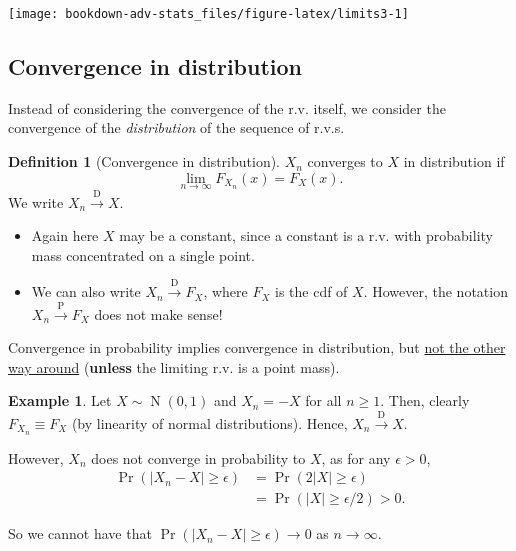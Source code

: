 \documentclass[
]{book}
\providecommand{\tightlist}{%
  \setlength{\itemsep}{0pt}\setlength{\parskip}{0pt}}
\DeclareMathOperator{\N}{N}
\theoremstyle{definition}
\newtheorem{definition}{Definition}[chapter]
\theoremstyle{definition}
\newtheorem{example}{Example}[chapter]
\theoremstyle{definition}
\theoremstyle{definition}
\theoremstyle{remark}
\begin{document}
\begin{center}\texttt{[image: bookdown-adv-stats\_files/figure-latex/limits3-1]} \end{center}

\hypertarget{convergence-in-distribution}{%
\subsection{Convergence in distribution}\label{convergence-in-distribution}}

Instead of considering the convergence of the r.v. itself, we consider the convergence of the \emph{distribution} of the sequence of r.v.s.

\begin{definition}[Convergence in distribution]
\(X_n\) converges to \(X\) in distribution if
\[\lim_{n\to\infty}F_{X_n}(x) = F_X(x).\]
We write
\(X_n\xrightarrow{\text{D}}X\).
\end{definition}

\begin{itemize}
\tightlist
\item
  Again here \(X\) may be a constant, since a constant is a r.v. with probability mass concentrated on a single point.
\item
  We can also write \(X_n{\xrightarrow{\text{D}}} F_X\), where \(F_X\) is the cdf of \(X\). However, the notation \(X_n{\xrightarrow{\text{P}}} F_X\) does not make sense!
\end{itemize}

Convergence in probability implies convergence in distribution, but \uline{not the other way around} (\textbf{unless} the limiting r.v. is a point mass).

\begin{example}
Let \(X\sim\N(0,1)\) and \(X_n=-X\) for all \(n \geq 1\). Then, clearly
\(F_{X_n} \equiv F_{X}\) (by linearity of normal distributions). Hence,
\(X_n\xrightarrow{\text{D}}X\).

However, \(X_n\) does not converge in probability to \(X\), as for any \(\epsilon>0\),
\[\begin{aligned}
       \Pr(|X_n-X|\geq\epsilon) &= \Pr(2|X|\geq\epsilon) \\
       &= \Pr(|X|\geq\epsilon/2) > 0.
    \end{aligned}\]

So we cannot have that \(\Pr(|X_n-X|\geq\epsilon) \to 0\) as \(n\to\infty\).
\end{example}
\end{document}
